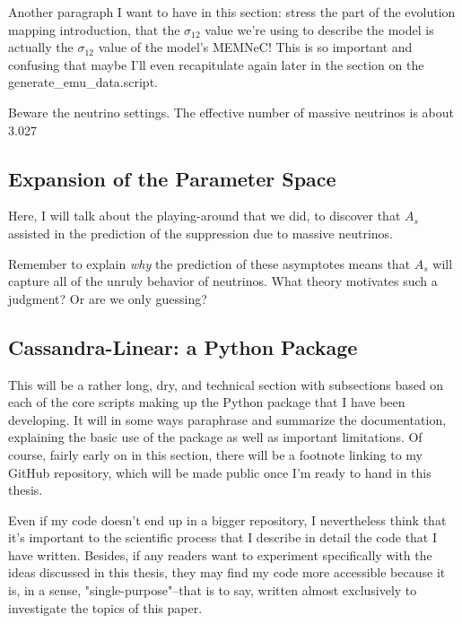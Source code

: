 \documentclass[11pt]{article}
\begin{document}
Another paragraph I want to have in this section: stress the part of the evolution mapping introduction, that the $\sigma_{12}$ value we're using to describe the model is actually the $\sigma_{12}$ value of the model's MEMNeC! This is so important and confusing that maybe I'll even recapitulate again later in the section on the generate\_emu\_data.script.


Beware the neutrino settings. The effective number of massive neutrinos is about 3.027

\begin{centering}
\section{Expansion of the Parameter Space}
\end{centering}

Here, I will talk about the playing-around that we did, to discover that $A_s$ assisted in the prediction of the suppression due to massive neutrinos.

Remember to explain \textit{why} the prediction of these asymptotes means that $A_s$ will capture all of the unruly behavior of neutrinos. What theory motivates such a judgment? Or are we only guessing?

\begin{centering}
\section{Cassandra-Linear: a Python Package}
\end{centering}

This will be a rather long, dry, and technical section with subsections based on each of the core scripts making up the Python package that I have been developing. It will in some ways paraphrase and summarize the documentation, explaining the basic use of the package as well as important limitations. Of course, fairly early on in this section, there will be a footnote linking to my GitHub repository, which will be made public once I'm ready to hand in this thesis.

Even if my code doesn't end up in a bigger repository, I nevertheless think that it's important to the scientific process that I describe in detail the code that I have written. Besides, if any readers want to experiment specifically with the ideas discussed in this thesis, they may find my code more accessible because it is, in a sense, "single-purpose"--that is to say, written almost exclusively to investigate the topics of this paper.
\end{document}

